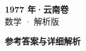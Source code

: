 \documentclass[zihao=-4, a4paper]{ctexart}
\begin{document}
\begin{center}
  {\Large\bfseries 1977 年·云南卷}\\[4pt]
  {\large 数学 · 解析版}
\end{center}
\medskip
{}

\clearpage
{}
\begin{center}{\Large\bfseries 参考答案与详细解析}\end{center}
\medskip

\end{document}
